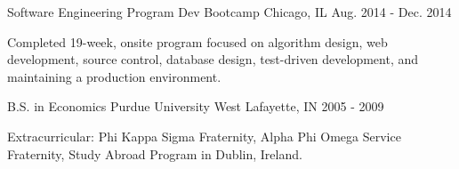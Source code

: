 

\begin{cventries}

    \cventry
    {Software Engineering Program} %
    {Dev Bootcamp} %
    {Chicago, IL} %
    {Aug. 2014 - Dec. 2014} %
    {
        \begin{cvitems} %
            \item {Completed 19-week, onsite program focused on algorithm design, web development, source control, database design, test-driven development, and maintaining a production environment.}
        \end{cvitems}
    }

    \cventry
    {B.S. in Economics} %
    {Purdue University} %
    {West Lafayette, IN} %
    {2005 - 2009} %
    {
        \begin{cvitems} %
            \item {Extracurricular: Phi Kappa Sigma Fraternity, Alpha Phi Omega Service Fraternity, Study Abroad Program in Dublin, Ireland.}
        \end{cvitems}
    }

\end{cventries}
